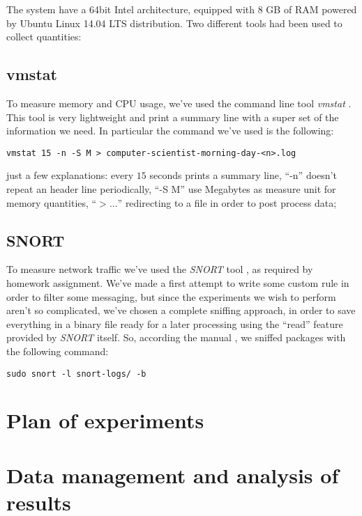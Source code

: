 \documentclass[10pt,a4paper]{article}
\begin{document}
    The system have a 64bit Intel architecture, equipped with 8 GB of
    RAM powered by Ubuntu Linux 14.04 LTS distribution. Two different
    tools had been used to collect quantities:

    \subsection{vmstat} 
    To measure memory and CPU usage, we've used the command line tool
    \emph{vmstat} \cite{vmstat}. This tool is very lightweight and
    print a summary line with a super set of the information we
    need. In particular the command we've used is the following:
\begin{verbatim}
vmstat 15 -n -S M > computer-scientist-morning-day-<n>.log
\end{verbatim}
    just a few explanations: every $15$ seconds prints a summary line,
    ``-n'' doesn't repeat an header line periodically, ``-S M'' use
    Megabytes as measure unit for memory quantities, ``$> ...$''
    redirecting to a file in order to post process data;

    \subsection{SNORT} 
    To measure network traffic we've used the \emph{SNORT} tool
    \cite{SNORT}, as required by homework assignment. We've made a
    first attempt to write some custom rule in order to filter some
    messaging, but since the experiments we wish to perform aren't so
    complicated, we've chosen a complete sniffing approach, in order
    to save everything in a binary file ready for a later processing
    using the ``read'' feature provided by \emph{SNORT} itself. So,
    according the manual \cite{SNORT-manual}, we sniffed packages with
    the following command:
\begin{verbatim}
sudo snort -l snort-logs/ -b
\end{verbatim}


    \section{Plan of experiments}
    \label{sec:plan-of-experiment}
    \lipsum[1]

    \section{Data management and analysis of results}
    \label{sec:data-management-result-analysis}
    \lipsum[1]
    
\end{document}
